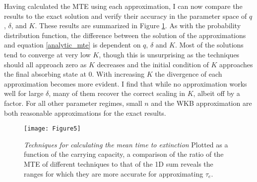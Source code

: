 \iffalse %
By omitting negligeable terms from the full solution to the MTE, equation \ref{analytic_mte}, we can heavily reduce the computational runtime in our calculation.
This becomes important at large population sizes, as the the number of terms in the analytical solution scale with the maximal size of the population.
$\tau_1$, the time it takes for the population to go extinct from a size of one individual, is also the first term in our sum and the dominant term in the solution.
Setting $\tau_e \sim \tau_1$ turns out to be a fine approximation.
However it is only a useful approximation for reducing computation runtime: we learn no more about the dependencies of the MTE on $q$ and $\delta$ than we do for the exact solution. 
\fi

Having calculated the MTE using each approximation, I can now compare the results to the exact solution and verify their accuracy in the parameter space of $q$, $\delta$, and $K$.
These results are summarized in Figure \ref{mte_techn}.
As with the probability distribution function, the difference between the solution of the approximations and equation \ref{analytic_mte} is dependent on $q$, $\delta$ and $K$. 
Most of the solutions tend to converge at very low $K$, though this is unsurprising as the techniques should all approach zero as $K$ decreases and the initial condition of $K$ approaches the final absorbing state at $0$. 
With increasing $K$ the divergence of each approximation becomes more evident. 
I find that while no approximation works well for large $\delta$, many of them recover the correct scaling in $K$, albeit off by a factor. %
For all other parameter regimes, small $n$ and the WKB approximation are both reasonable approximations for the exact results. %

\begin{figure}[ht!]
	\centering
	\texttt{[image: Figure5]}
	\caption{\emph{Techniques for calculating the mean time to extinction} Plotted as a function of the carrying capacity, a comparison of the ratio of the MTE of different techniques to that of the 1D sum reveals the ranges for which they are more accurate for approximating $\tau_{e}$.} \label{mte_techn}
\end{figure}






